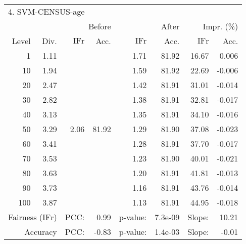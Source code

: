 \begin{tabular}{rr||rr|rr|rr}
\multicolumn{4}{l}{4. SVM-CENSUS-age} & \multicolumn{2}{c}{} & \multicolumn{2}{c}{}\\
 &  & \multicolumn{2}{r|}{Before} & \multicolumn{2}{r|}{After} & \multicolumn{2}{r}{Impr. (\%)}\\
Level & Div. & $\mathrm{IFr}$ & Acc. & $\mathrm{IFr}$ & Acc. & $\mathrm{IFr}$ & Acc.\\
\hline
1 & 1.11 & \multirow{11}{*}{2.06} & \multirow{11}{*}{81.92} & 1.71 & 81.92 & 16.67 & 0.006\\
10 & 1.94 &  &  & 1.59 & 81.92 & 22.69 & -0.006\\
20 & 2.47 &  &  & 1.42 & 81.91 & 31.01 & -0.014\\
30 & 2.82 &  &  & 1.38 & 81.91 & 32.81 & -0.017\\
40 & 3.13 &  &  & 1.35 & 81.91 & 34.10 & -0.016\\
50 & 3.29 &  &  & 1.29 & 81.90 & 37.08 & -0.023\\
60 & 3.41 &  &  & 1.28 & 81.91 & 37.70 & -0.017\\
70 & 3.53 &  &  & 1.23 & 81.90 & 40.01 & -0.021\\
80 & 3.63 &  &  & 1.20 & 81.91 & 41.81 & -0.013\\
90 & 3.73 &  &  & 1.16 & 81.91 & 43.76 & -0.014\\
100 & 3.87 &  &  & 1.13 & 81.91 & 44.95 & -0.018\\
\hline
\multicolumn{2}{r}{Fairness ($\mathrm{IFr}$)} & PCC: & \multicolumn{1}{r}{0.99} & p-value:  & \multicolumn{1}{r}{7.3e-09} & Slope:  & 10.21\\
\multicolumn{2}{r}{Accuracy} & PCC: & \multicolumn{1}{r}{-0.83} & p-value:  & \multicolumn{1}{r}{1.4e-03} & Slope:  & -0.01\\
\end{tabular}